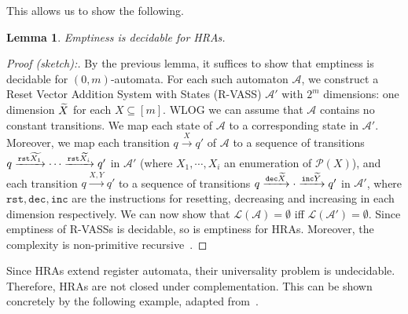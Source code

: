 \documentclass{article}
\newtheorem{lemma}[theorem]{Lemma}
\theoremstyle{definition}
\renewcommand\AA{\mathcal{A}}
\newcommand\PP{\mathcal{P}}
\newcommand\LL{\mathcal{L}}
\newcommand\ta{,}
\begin{document}
This allows us to show the following.

\begin{lemma}
Emptiness is decidable for HRAs.
\end{lemma}
\begin{proof}[Proof (sketch):]
By the previous lemma, it suffices to show that emptiness is decidable for $(0,m)$-automata. For each such automaton $\AA$, we construct a Reset Vector Addition System with States (R-VASS) $\AA'$ with $2^m$ dimensions: one dimension $\widetilde{X}$ for each $X\subseteq[m]$. WLOG we can assume that $\AA$ contains no constant transitions. We map each state of $\AA$ to a corresponding state in $\AA'$. Moreover, we map each transition $q\xrightarrow{X}q'$ of $\AA$ to a sequence of transitions $q\xrightarrow{\mathtt{rst}\widetilde{X_1}}\cdots\xrightarrow{\mathtt{rst}\widetilde{X_i}}q'$ in $\AA'$ (where $X_1,\cdots,X_i$ an enumeration of $\PP(X)$), and each transition $q\xrightarrow{X\ta Y}q'$ to a sequence of transitions $q\xrightarrow{\mathtt{dec}\widetilde{X}}\cdot\xrightarrow{\mathtt{inc}\widetilde{Y}}q'$ in $\AA'$, where $\mathtt{rst},\mathtt{dec},\mathtt{inc}$ are the instructions for resetting, decreasing and increasing in each dimension respectively. We can now show that $\LL(\AA)=\emptyset$ iff $\LL(\AA')=\emptyset$. Since emptiness of R-VASSs is decidable, so is emptiness for HRAs. Moreover, the complexity is non-primitive recursive~\cite{Schnoebelen_MFCS10}.
\end{proof}

Since HRAs extend register automata, their universality problem is undecidable. Therefore, HRAs are not closed under complementation. This can be shown concretely by the following example, adapted from~\cite{Manuel_Ramanujam_2011}.
\end{document}
